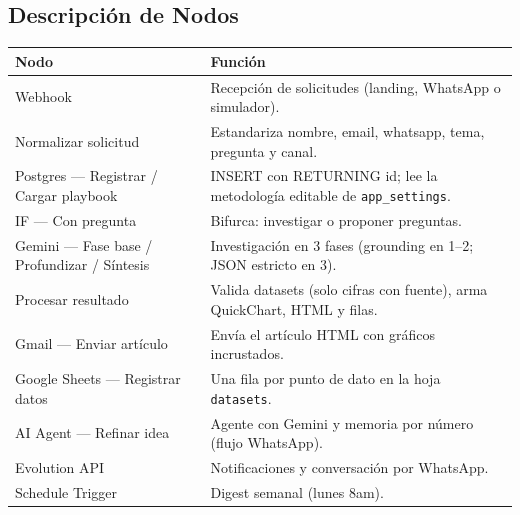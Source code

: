 \documentclass[11pt,a4paper]{article}
\newcommand{\code}[1]{\texttt{\small #1}}
\begin{document}
\subsection{Descripción de Nodos}
\renewcommand{\arraystretch}{1.2}
\begin{longtable}{L{4.6cm} L{10.4cm}}
\toprule
\textbf{Nodo} & \textbf{Función}\\ \midrule \endhead
Webhook & Recepción de solicitudes (landing, WhatsApp o simulador).\\
Normalizar solicitud & Estandariza nombre, email, whatsapp, tema, pregunta y canal.\\
Postgres --- Registrar / Cargar playbook & INSERT con RETURNING id; lee la metodología editable de \code{app\_settings}.\\
IF --- Con pregunta & Bifurca: investigar o proponer preguntas.\\
Gemini --- Fase base / Profundizar / Síntesis & Investigación en 3 fases (grounding en 1--2; JSON estricto en 3).\\
Procesar resultado & Valida datasets (solo cifras con fuente), arma QuickChart, HTML y filas.\\
Gmail --- Enviar artículo & Envía el artículo HTML con gráficos incrustados.\\
Google Sheets --- Registrar datos & Una fila por punto de dato en la hoja \code{datasets}.\\
AI Agent --- Refinar idea & Agente con Gemini y memoria por número (flujo WhatsApp).\\
Evolution API & Notificaciones y conversación por WhatsApp.\\
Schedule Trigger & Digest semanal (lunes 8am).\\
\bottomrule
\end{longtable}

\end{document}
